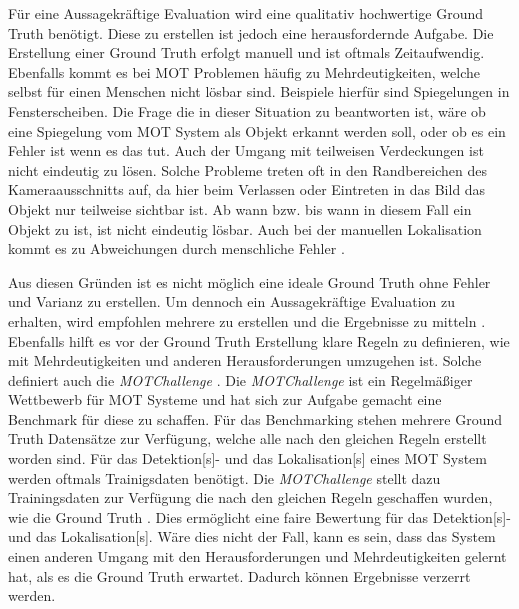 Für eine Aussagekräftige Evaluation wird eine qualitativ hochwertige \gls{Ground Truth} benötigt. Diese zu erstellen ist jedoch eine herausfordernde Aufgabe. Die Erstellung einer \gls{Ground Truth} erfolgt manuell und ist oftmals Zeitaufwendig. Ebenfalls kommt es bei \gls{MOT} Problemen häufig zu Mehrdeutigkeiten, welche selbst für einen Menschen nicht lösbar sind. Beispiele hierfür sind Spiegelungen in Fensterscheiben. Die Frage die in dieser Situation zu beantworten ist, wäre ob eine Spiegelung vom \gls{MOT} System als Objekt erkannt werden soll, oder ob es ein Fehler ist wenn es das tut. Auch der Umgang mit teilweisen Verdeckungen ist nicht eindeutig zu lösen. Solche Probleme treten oft in den Randbereichen des Kameraausschnitts auf, da hier beim Verlassen oder Eintreten in das Bild das Objekt nur teilweise sichtbar ist. Ab wann bzw. bis wann in diesem Fall ein Objekt zu  ist, ist nicht eindeutig lösbar. Auch bei der manuellen \gls{Lokalisation} kommt es zu Abweichungen durch menschliche Fehler \cite{MOT15, Milan.2013}.  \par

Aus diesen Gründen ist es nicht möglich eine ideale \gls{Ground Truth} ohne Fehler und Varianz zu erstellen. Um dennoch ein Aussagekräftige Evaluation zu erhalten, wird empfohlen mehrere  zu erstellen und die Ergebnisse zu mitteln \cite{Milan.2013}. Ebenfalls hilft es vor der \gls{Ground Truth} Erstellung klare Regeln zu definieren, wie mit Mehrdeutigkeiten und anderen Herausforderungen umzugehen ist. Solche definiert auch die \textit{MOTChallenge} \cite{MOT16, MOT20}. Die \textit{MOTChallenge} ist ein Regelmäßiger Wettbewerb für \gls{MOT} Systeme und hat sich zur Aufgabe gemacht eine Benchmark für diese zu schaffen. Für das Benchmarking stehen mehrere \gls{Ground Truth} Datensätze zur Verfügung, welche alle nach den gleichen Regeln erstellt worden sind. Für das \gls{Detektion}[s]- und das \gls{Lokalisation}[s] eines \gls{MOT} System werden oftmals Trainigsdaten benötigt. Die \textit{MOTChallenge} stellt dazu Trainingsdaten zur Verfügung die nach den gleichen Regeln geschaffen wurden, wie die \gls{Ground Truth} \cite{MOT16, MOT20}. Dies ermöglicht eine faire Bewertung für das \gls{Detektion}[s]- und das \gls{Lokalisation}[s]. Wäre dies nicht der Fall, kann es sein, dass das System einen anderen Umgang mit den Herausforderungen und Mehrdeutigkeiten gelernt hat, als es die \gls{Ground Truth} erwartet. Dadurch können Ergebnisse verzerrt werden. \par

